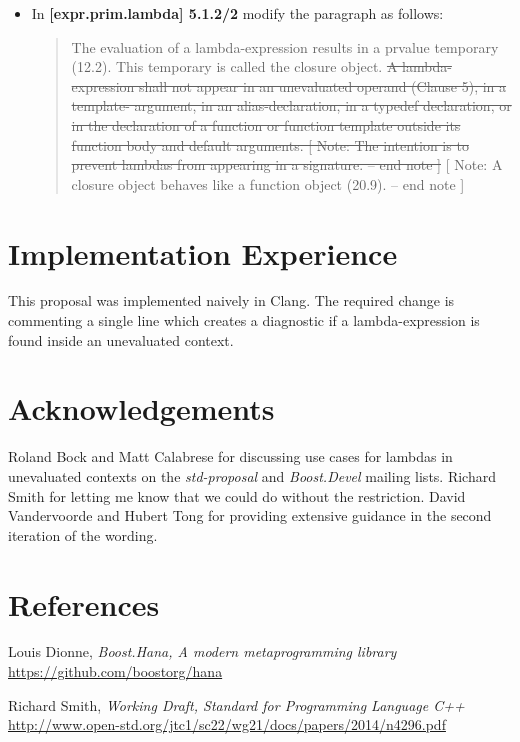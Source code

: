 \documentclass[11pt]{article}
\newcommand{\deleted}[1]{\st{#1}}
\begin{document}
\begin{itemize}
    \item In \textbf{[expr.prim.lambda] 5.1.2/2} modify the paragraph as follows:
    \begin{quote}
        The evaluation of a lambda-expression results in a prvalue temporary
        (12.2). This temporary is called the closure object. \deleted{A
        lambda-expression shall not appear in an unevaluated operand (Clause 5),
        in a template- argument, in an alias-declaration, in a typedef declaration,
        or in the declaration of a function or function template outside its function
        body and default arguments. [ Note: The intention is to prevent lambdas from
        appearing in a signature. -- end note ]} [ Note: A closure object behaves like
        a function object (20.9). -- end note ]
    \end{quote}
\end{itemize}


\section{Implementation Experience}
This proposal was implemented naively in Clang. The required change is commenting
a single line which creates a diagnostic if a lambda-expression is found inside an
unevaluated context.


\section{Acknowledgements}
Roland Bock and Matt Calabrese for discussing use cases for lambdas in unevaluated
contexts on the \textit{std-proposal} and \textit{Boost.Devel} mailing lists.
Richard Smith for letting me know that we could do without the restriction.
David Vandervoorde and Hubert Tong for providing extensive guidance in the
second iteration of the wording.


\section{References}
\renewcommand{\section}[2]{}%
\begin{thebibliography}{9}

    Louis Dionne,
    \emph{Boost.Hana, A modern metaprogramming library}\newline
    \url{https://github.com/boostorg/hana}

    Richard Smith,
    \emph{Working Draft, Standard for Programming Language C++}\newline
    \url{http://www.open-std.org/jtc1/sc22/wg21/docs/papers/2014/n4296.pdf}

\end{thebibliography}
\end{document}
